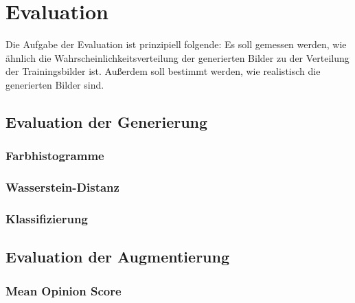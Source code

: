 \chapter{Evaluation}
Die Aufgabe der Evaluation ist prinzipiell folgende: Es soll gemessen werden, wie ähnlich die Wahrscheinlichkeitsverteilung der generierten Bilder zu der Verteilung der Trainingsbilder ist. Außerdem soll bestimmt werden, wie realistisch die generierten Bilder sind.

\label{chap:Evaluation}
\section{Evaluation der Generierung}
\subsection{Farbhistogramme}
\subsection{Wasserstein-Distanz}
\subsection{Klassifizierung}
\section{Evaluation der Augmentierung}
\subsection{Mean Opinion Score}